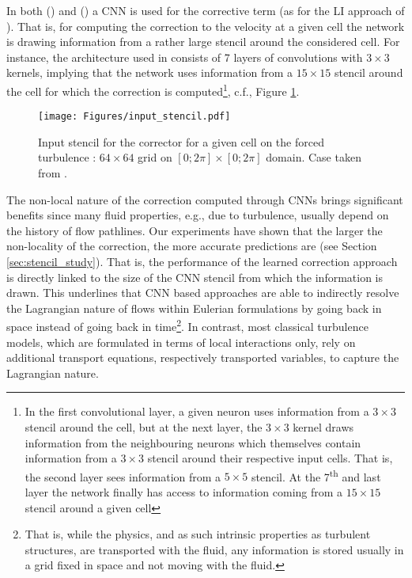 In both \citeauthor{um2020solver} (\citeyear{um2020solver}) and \citeauthor{kochkov2021machine} (\citeyear{kochkov2021machine}) a CNN is used for the corrective term (as for the LI approach of \citeauthor{kochkov2021machine}). That is, for computing the correction to the velocity at a given cell the network is drawing information from a rather large stencil around the considered cell. For instance, the architecture used in \citeauthor{kochkov2021machine} consists of 7 layers of convolutions with $3\times3$ kernels, implying that the network uses information from a $15\times15$ stencil around the cell for which the correction is computed\footnote{In the first convolutional layer, a given neuron uses information from a $3\times3$ stencil around the cell, but at the next layer, the $3\times3$ kernel draws information from the neighbouring neurons which themselves contain information from a $3\times3$ stencil around their respective input cells. That is, the second layer sees information from a $5\times5$ stencil. At the 7\textsuperscript{th} and last layer the network finally has access to information coming from a $15\times15$ stencil around a given cell}, c.f., Figure \ref{fig:input_stencil}.

\begin{figure}[H]
    \centering
    \texttt{[image: Figures/input\_stencil.pdf]}
    \caption{Input stencil for the corrector for a given cell on the forced turbulence : $64\times64$ grid on $[0;2\pi]\times[0;2\pi]$ domain. Case taken from \citeauthor{kochkov2021machine}.}
    \label{fig:input_stencil}
\end{figure}

The non-local nature of the correction computed through CNNs brings significant benefits since many fluid properties, e.g., due to turbulence, usually depend on the history of flow pathlines. Our experiments have shown that the larger the non-locality of the correction, the more accurate predictions are (see Section \ref{sec:stencil_study}). That is, the performance of the learned correction approach is directly linked to the size of the CNN stencil from which the information is drawn. This underlines that CNN based  approaches are able to indirectly resolve the Lagrangian nature of flows within Eulerian formulations by going back in space instead of going back in time\footnote{That is, while the physics, and as such intrinsic properties as turbulent structures, are transported  with the fluid, any information is stored usually in a grid fixed in space and not moving with the fluid.}. In contrast, most classical turbulence models, which are formulated in terms of local interactions only, rely on additional transport equations, respectively transported variables, \cite{pope2000turbulent} to capture the Lagrangian nature.
